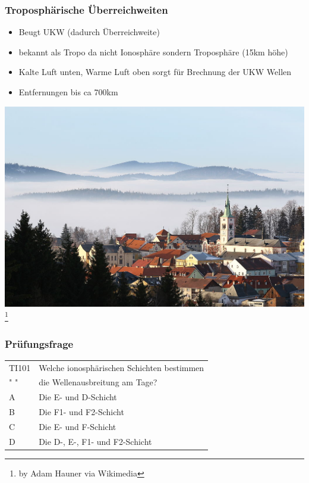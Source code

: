 \begin{frame}
    \frametitle{Troposphärische Überreichweiten}
    \begin{itemize}
    			\item Beugt UKW (dadurch Überreichweite)
				\item bekannt als Tropo da nicht Ionosphäre sondern Troposphäre (15km höhe)
       		 	\item Kalte Luft unten, Warme Luft oben sorgt für Brechnung der UKW Wellen
       		 	\item Entfernungen bis ca 700km
    \end{itemize}
    	\begin{center}
        \includegraphics[width=.65\textwidth]{e09/tropo.jpg}
        \footnote{\tiny by Adam Hauner via Wikimedia}
    \end{center}
\end{frame}

\begin{frame}
    \frametitle{Prüfungsfrage}

    \begin{center}
    \begin{tabular}{l||l}\hline
        TI101 & Welche ionosphärischen Schichten bestimmen \\
         " "  & die Wellenausbreitung am Tage? \\\hline\hline
         A 	  & Die E- und D-Schicht \\\hline
         B 	  & Die F1- und F2-Schicht \\\hline
         C	  & Die E- und F-Schicht \\\hline
         D 	  & Die D-, E-, F1- und F2-Schicht\\\hline
    \end{tabular}
 	\end{center}
\end{frame}

